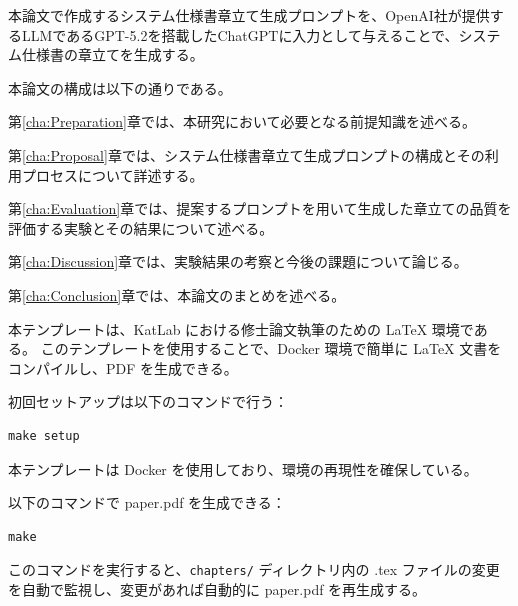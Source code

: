 本論文で作成するシステム仕様書章立て生成プロンプトを、OpenAI\cite{openai}社が提供するLLMであるGPT-5.2\cite{gpt52}を搭載したChatGPT\cite{chatgpt}に入力として与えることで、システム仕様書の章立てを生成する。


本論文の構成は以下の通りである。

第\ref{cha:Preparation}章では、本研究において必要となる前提知識を述べる。

第\ref{cha:Proposal}章では、システム仕様書章立て生成プロンプトの構成とその利用プロセスについて詳述する。


第\ref{cha:Evaluation}章では、提案するプロンプトを用いて生成した章立ての品質を評価する実験とその結果について述べる。

第\ref{cha:Discussion}章では、実験結果の考察と今後の課題について論じる。

第\ref{cha:Conclusion}章では、本論文のまとめを述べる。

\iffalse
本テンプレートは、KatLab における修士論文執筆のための LaTeX 環境である。
このテンプレートを使用することで、Docker 環境で簡単に LaTeX 文書をコンパイルし、PDF を生成できる。


初回セットアップは以下のコマンドで行う：
\begin{verbatim}
make setup
\end{verbatim}

本テンプレートは Docker を使用しており、環境の再現性を確保している\cite{kimura-docker}。

以下のコマンドで paper.pdf を生成できる：
\begin{verbatim}
make
\end{verbatim}

このコマンドを実行すると、\verb|chapters/| ディレクトリ内の .tex ファイルの変更を自動で監視し、変更があれば自動的に paper.pdf を再生成する。

